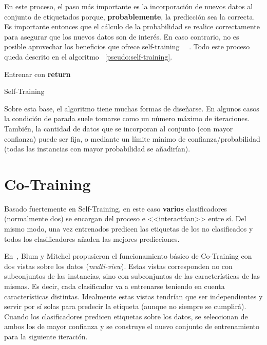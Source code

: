 En este proceso, el paso más importante es la incorporación de nuevos datos al
conjunto de etiquetados porque, \textbf{probablemente}, la predicción sea la
correcta. Es importante entonces que el cálculo de la probabilidad se realice
correctamente para asegurar que los nuevos datos son de interés. En caso
contrario, no es posible aprovechar los beneficios que ofrece self-training~
~\cite{vanEngelen2020}. Todo este proceso queda descrito en el algoritmo
~\ref{pseudo:self-training}.

\begin{algorithm}
    \DontPrintSemicolon
     Entrenar  con \;
     \textbf{return} 
     \caption{Self-Training}\label{pseudo:self-training}
\end{algorithm}

Sobre esta base, el algoritmo tiene muchas formas de diseñarse. En algunos casos
la condición de parada suele tomarse como un número máximo de iteraciones.
También, la cantidad de datos que se incorporan al conjunto 
(con mayor confianza) puede ser fija, o mediante un límite mínimo de
confianza/probabilidad (todas las instancias con mayor probabilidad se
añadirían).

\section{Co-Training}
Basado fuertemente en Self-Training, en este caso \textbf{varios} clasificadores
(normalmente dos) se encargan del proceso e <<interactúan>> entre sí. Del mismo
modo, una vez entrenados predicen las etiquetas de los no clasificados y todos
los clasificadores añaden las mejores predicciones.

En~\cite{blum1998combining}, Blum y Mitchel propusieron el funcionamiento básico
de Co-Training con dos vistas sobre los datos (\emph{multi-view}). Estas vistas
corresponden no con subconjuntos de las instancias, sino con subconjuntos de las
características de las mismas. Es decir, cada clasificador va a entrenarse
teniendo en cuenta características distintas. Idealmente estas vistas tendrían
que ser independientes y servir por sí solas para predecir la etiqueta (aunque
no siempre se cumplirá). Cuando los clasificadores predicen etiquetas sobre los
datos, se seleccionan de ambos los de mayor confianza y se construye el nuevo
conjunto de entrenamiento para la siguiente iteración.


